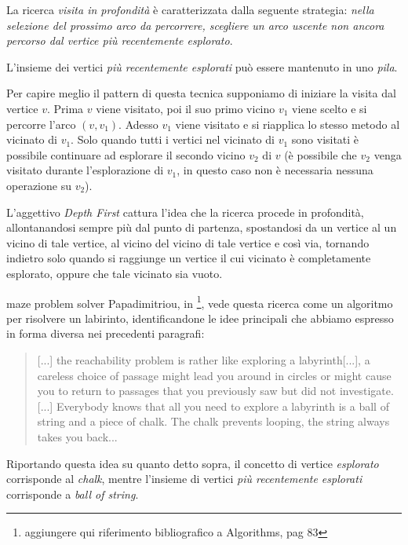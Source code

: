 La ricerca \emph{visita in profondit\`a} \`e caratterizzata dalla
seguente strategia: \emph{nella selezione del prossimo arco da
  percorrere, scegliere un arco uscente non ancora percorso dal
  vertice pi\`u recentemente esplorato}.

L'insieme dei vertici \emph{pi\`u recentemente esplorati} pu\`o essere
mantenuto in uno \emph{pila}.

Per capire meglio il pattern di questa tecnica supponiamo di iniziare
la visita dal vertice $v$. Prima $v$ viene visitato, poi il suo primo
vicino $v_{1}$ viene scelto e si percorre l'arco $(v, v_{1})$. Adesso
$v_{1}$ viene visitato e si riapplica lo stesso metodo al vicinato di
$v_{1}$. Solo quando tutti i vertici nel vicinato di $v_{1}$ sono
visitati \`e possibile continuare ad esplorare il secondo vicino
$v_{2}$ di $v$ (\`e possibile che $v_{2}$ venga visitato durante
l'esplorazione di $v_{1}$, in questo caso non \`e necessaria nessuna
operazione su $v_{2}$).

L'aggettivo \emph{Depth First} cattura l'idea che la ricerca procede
in profondit\`a, allontanandosi sempre pi\`u dal punto di partenza,
spostandosi da un vertice al un vicino di tale vertice, al vicino del
vicino di tale vertice e cos\`i via, tornando indietro solo quando si
raggiunge un vertice il cui vicinato \`e completamente esplorato,
oppure che tale vicinato sia vuoto.

\begin{paragraph}{maze problem solver}
  Papadimitriou, in \footnote{aggiungere qui riferimento bibliografico
    a Algorithms, pag 83}, vede questa ricerca come un algoritmo per
  risolvere un labirinto, identificandone le idee principali che
  abbiamo espresso in forma diversa nei precedenti paragrafi:
\begin{quotation}
  [...] the reachability problem is rather like exploring a
  labyrinth[...], a careless choice of passage might lead you around
  in circles or might cause you to return to passages that you
  previously saw but did not investigate.[...] Everybody knows that
  all you need to explore a labyrinth is a ball of string and a piece
  of chalk. The chalk prevents looping, the string always takes you
  back...
\end{quotation}
Riportando questa idea su quanto detto sopra, il concetto di vertice
\emph{esplorato} corrisponde al \emph{chalk}, mentre l'insieme di
vertici \emph{pi\`u recentemente esplorati} corrisponde a \emph{ball
  of string}.
\end{paragraph}

